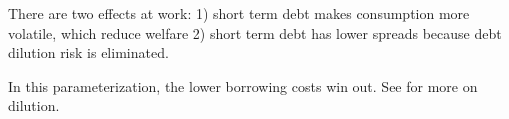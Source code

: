 \documentclass[11pt, pdftex]{article}
\begin{document}
There are two effects at work: 1) short term debt makes consumption more volatile, which reduce welfare 2) short term debt has lower spreads because debt dilution risk is eliminated.

In this parameterization, the lower borrowing costs win out. See \citet{hatchondo2016debt} for more on dilution.

\setlength{\parskip}{0.0cm}
\printbibliography
\end{document}

